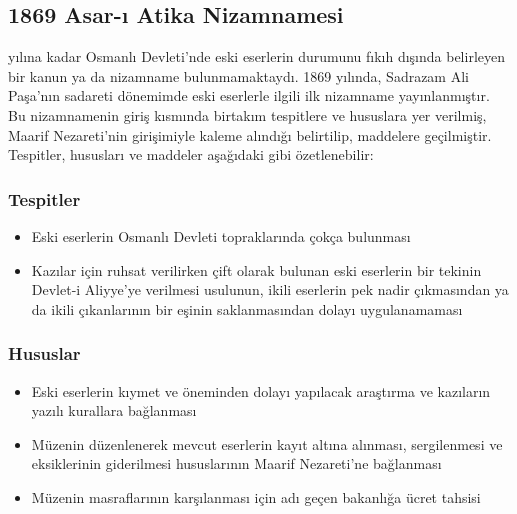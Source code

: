 \subsection{1869 Asar-ı Atika Nizamnamesi}
\indent{} yılına kadar Osmanlı Devleti'nde eski eserlerin durumunu fıkıh dışında belirleyen bir kanun ya da nizamname bulunmamaktaydı. 1869 yılında, Sadrazam Ali Paşa'nın sadareti dönemimde eski eserlerle ilgili ilk nizamname yayınlanmıştır. Bu nizamnamenin giriş kısmında birtakım tespitlere ve hususlara yer verilmiş, Maarif Nezareti'nin girişimiyle kaleme alındığı belirtilip, maddelere geçilmiştir. Tespitler, hususları ve maddeler aşağıdaki gibi özetlenebilir:\cite{karaduman}
\subsubsection{Tespitler}
\begin{itemize}
    \item Eski eserlerin Osmanlı Devleti topraklarında çokça bulunması
    \item Kazılar için ruhsat verilirken çift olarak bulunan eski eserlerin bir tekinin Devlet-i Aliyye'ye verilmesi usulunun, ikili eserlerin pek nadir çıkmasından ya da ikili çıkanlarının bir eşinin saklanmasından dolayı uygulanamaması
\end{itemize}
\subsubsection{Hususlar}
\begin{itemize}
    \item Eski eserlerin kıymet ve öneminden dolayı yapılacak araştırma ve kazıların yazılı kurallara bağlanması
    \item Müzenin düzenlenerek mevcut eserlerin kayıt altına alınması, sergilenmesi ve eksiklerinin giderilmesi hususlarının Maarif Nezareti'ne bağlanması
    \item Müzenin masraflarının karşılanması için adı geçen bakanlığa ücret tahsisi
\end{itemize}
